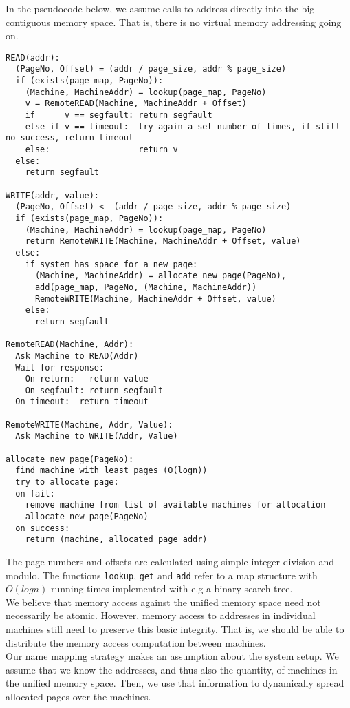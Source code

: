 \documentclass[11pt]{article}
\begin{document}
In the pseudocode below, we assume calls to address directly into the big
contiguous memory space. That is, there is no virtual memory addressing going
on.
\begin{Verbatim}
READ(addr):
  (PageNo, Offset) = (addr / page_size, addr % page_size)
  if (exists(page_map, PageNo)):
    (Machine, MachineAddr) = lookup(page_map, PageNo)
    v = RemoteREAD(Machine, MachineAddr + Offset)
    if      v == segfault: return segfault
    else if v == timeout:  try again a set number of times, if still no success, return timeout
    else:                  return v
  else:
    return segfault

WRITE(addr, value):
  (PageNo, Offset) <- (addr / page_size, addr % page_size)
  if (exists(page_map, PageNo)):
    (Machine, MachineAddr) = lookup(page_map, PageNo)
    return RemoteWRITE(Machine, MachineAddr + Offset, value)
  else:
    if system has space for a new page:
      (Machine, MachineAddr) = allocate_new_page(PageNo),
      add(page_map, PageNo, (Machine, MachineAddr))
      RemoteWRITE(Machine, MachineAddr + Offset, value)
    else:
      return segfault

RemoteREAD(Machine, Addr):
  Ask Machine to READ(Addr)
  Wait for response:
    On return:   return value
    On segfault: return segfault
  On timeout:  return timeout

RemoteWRITE(Machine, Addr, Value):
  Ask Machine to WRITE(Addr, Value)

allocate_new_page(PageNo):
  find machine with least pages (O(logn))
  try to allocate page:
  on fail:
    remove machine from list of available machines for allocation
    allocate_new_page(PageNo)
  on success:
    return (machine, allocated page addr)

\end{Verbatim}
The page numbers and offsets are calculated using simple integer division and
modulo. The functions \verb|lookup|, \verb|get| and \verb|add| refer to a map
structure with $O(logn)$ running times implemented with e.g a binary search
tree.\\

We believe that memory access against the unified memory space need not
necessarily be atomic. However, memory access to addresses in individual
machines still need to preserve this basic integrity. That is, we should be able
to distribute the memory access computation between machines.\\

Our name mapping strategy makes an assumption about the system setup.
We assume that we know the addresses, and thus also the quantity, of machines in
the unified memory space. Then, we use that information to dynamically spread
allocated pages over the machines.
\end{document}
